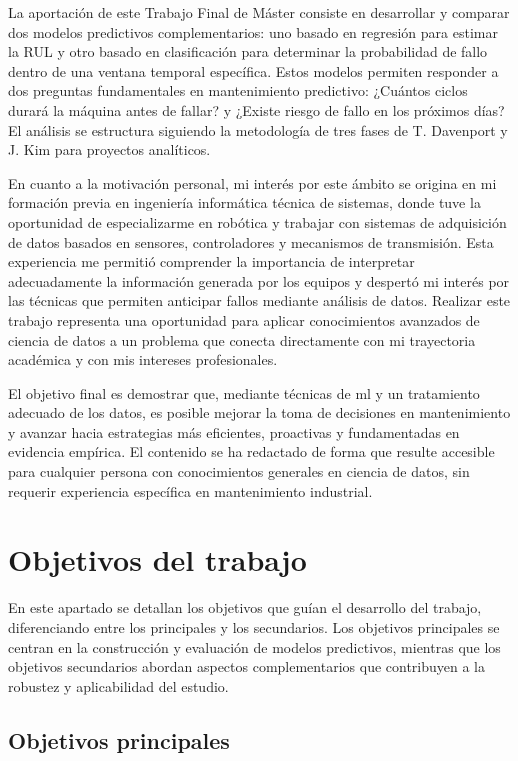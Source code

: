 \documentclass[IB]{TFUOC}
\begin{document}
La aportación de este Trabajo Final de Máster consiste en desarrollar y comparar dos modelos predictivos
complementarios: uno basado en regresión para estimar la \gls{RUL} y otro basado en clasificación para determinar la
probabilidad de fallo dentro de una ventana temporal específica. Estos modelos permiten responder a dos preguntas
fundamentales en mantenimiento predictivo: ¿Cuántos ciclos durará la máquina antes de fallar? y ¿Existe riesgo de fallo
en los próximos días? El análisis se estructura siguiendo la metodología de tres fases de T. Davenport y J. Kim para
proyectos analíticos.

En cuanto a la motivación personal, mi interés por este ámbito se origina en mi formación previa en ingeniería
informática técnica de sistemas, donde tuve la oportunidad de especializarme en robótica y trabajar con sistemas de
adquisición de datos basados en sensores, controladores y mecanismos de transmisión. Esta experiencia me permitió
comprender la importancia de interpretar adecuadamente la información generada por los equipos y despertó mi interés por
las técnicas que permiten anticipar fallos mediante análisis de datos. Realizar este trabajo representa una oportunidad
para aplicar conocimientos avanzados de ciencia de datos a un problema que conecta directamente con mi trayectoria
académica y con mis intereses profesionales.

El objetivo final es demostrar que, mediante técnicas de \gls{ml} y un tratamiento adecuado de los datos, es posible
mejorar la toma de decisiones en mantenimiento y avanzar hacia estrategias más eficientes, proactivas y fundamentadas en
evidencia empírica. El contenido se ha redactado de forma que resulte accesible para cualquier persona con conocimientos
generales en ciencia de datos, sin requerir experiencia específica en mantenimiento industrial.

\section{Objetivos del trabajo}

En este apartado se detallan los objetivos que guían el desarrollo del trabajo, diferenciando entre los principales y
los secundarios. Los objetivos principales se centran en la construcción y evaluación de modelos predictivos, mientras
que los objetivos secundarios abordan aspectos complementarios que contribuyen a la robustez y aplicabilidad del
estudio.

\subsection{Objetivos principales}
\end{document}

